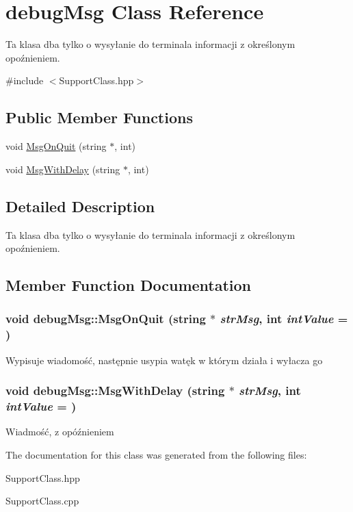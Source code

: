 \hypertarget{classdebugMsg}{
\section{debugMsg Class Reference}
\label{classdebugMsg}
}


Ta klasa dba tylko o wysyłanie do terminala informacji z określonym opoźnieniem.  




{\ttfamily \#include $<$SupportClass.hpp$>$}

\subsection*{Public Member Functions}
\begin{DoxyCompactItemize}
\item 
void \hyperlink{classdebugMsg_a64167d8cd68ec044b211e9aeb4c34e76}{MsgOnQuit} (string $\ast$, int)
\item 
void \hyperlink{classdebugMsg_a4b45960ebecff6ad91cef6a915d5b3b6}{MsgWithDelay} (string $\ast$, int)
\end{DoxyCompactItemize}


\subsection{Detailed Description}
Ta klasa dba tylko o wysyłanie do terminala informacji z określonym opoźnieniem. 

\subsection{Member Function Documentation}
\hypertarget{classdebugMsg_a64167d8cd68ec044b211e9aeb4c34e76}{
\subsubsection[{MsgOnQuit}]{\setlength{\rightskip}{0pt plus 5cm}void debugMsg::MsgOnQuit (string $\ast$ {\em strMsg}, \/  int {\em intValue} = {})}}
\label{classdebugMsg_a64167d8cd68ec044b211e9aeb4c34e76}


Wypisuje wiadomość, następnie usypia watęk w którym działa i wyłacza go 

\hypertarget{classdebugMsg_a4b45960ebecff6ad91cef6a915d5b3b6}{
\subsubsection[{MsgWithDelay}]{\setlength{\rightskip}{0pt plus 5cm}void debugMsg::MsgWithDelay (string $\ast$ {\em strMsg}, \/  int {\em intValue} = {})}}
\label{classdebugMsg_a4b45960ebecff6ad91cef6a915d5b3b6}


Wiadmość, z opóźnieniem 



The documentation for this class was generated from the following files:\begin{DoxyCompactItemize}
\item 
SupportClass.hpp\item 
SupportClass.cpp\end{DoxyCompactItemize}
